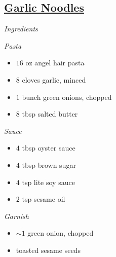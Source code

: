 \documentclass{article}
\newcommand{\ingredients}[1][\Large\emph{Ingredients}]{%
    \emph{#1}\\}
\begin{document}
\begin{minipage}{\textwidth}
\setlength{\columnseprule}{0.5pt}
\begin{vwcol}[widths={0.6,0.4}, rule=0pt]
\begin{minipage}{0.58\linewidth}
\section*{\underline{Garlic Noodles}}
\ingredients

\begin{minipage}{\textwidth}
\setlength{\columnseprule}{0pt}
\begin{multicols*}{2}
\begin{minipage}{\linewidth}
\ingredients[Pasta]
\vspace{-1em}
\begin{itemize}
    \item $16$ oz angel hair pasta
    \item $8$ cloves garlic, minced
    \item $1$ bunch green onions, chopped
    \item $8$ tbsp salted butter
\end{itemize}
\end{minipage}

\columnbreak
\begin{minipage}{\linewidth}
\ingredients[Sauce]
\vspace{-1em}
\begin{itemize}
    \item $4$ tbsp oyster sauce
    \item $4$ tbsp brown sugar
    \item $4$ tsp lite soy sauce
    \item $2$ tsp sesame oil
\end{itemize}
\end{minipage}
\end{multicols*}
\begin{minipage}{\textwidth}
\ingredients[Garnish]
\vspace{-1em}
\begin{itemize}
    \item $\sim1$ green onion, chopped
    \item toasted sesame seeds
\end{itemize}
\end{minipage}
\end{minipage}
\end{minipage}
\begin{minipage}{0.55\textwidth}
\vspace{1em}


\end{minipage}
\end{vwcol}
\end{minipage}
\end{document}
